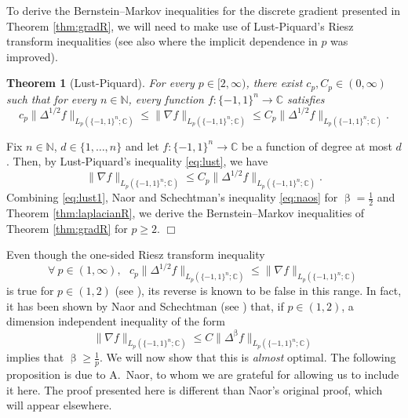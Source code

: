 \documentclass[11pt,reqno]{amsart}
\renewcommand{\leq}{\leqslant}
\renewcommand{\geq}{\geqslant}
\newcommand{\1}{\mathbf 1}
\newtheorem{theorem}{Theorem}
\theoremstyle{remark}
\newcommand{\C}{\mathbb C}
\newcommand{\N}{\mathbb N}
\renewcommand{\beta}{\upbeta}
\begin{document}
\medskip

To derive the Bernstein--Markov inequalities for the discrete gradient presented in Theorem \ref{thm:gradR}, we will need to make use of Lust-Piquard's Riesz transform inequalities \cite{LP98} (see also \cite{BELP08} where the implicit dependence in $p$ was improved).

\begin{theorem} [Lust-Piquard]
For every $p\in[2,\infty)$, there exist $c_p,C_p\in(0,\infty)$ such that for every $n\in\N$, every function $f:\{-1,1\}^n\to\C$ satisfies
\begin{equation} \label{eq:lust}
c_p\|\Delta^{1/2}f\|_{L_p(\{-1,1\}^n;\C)} \leq \|\nabla f\|_{L_p(\{-1,1\}^n;\C)}\leq C_p \|\Delta^{1/2}f\|_{L_p(\{-1,1\}^n;\C)}.
\end{equation}
\end{theorem}

\medskip

\noindent {\it Proof of Theorem \ref{thm:gradR} for $p\geq2$.}
Fix $n\in\N$, $d\in\{1,\ldots,n\}$ and let $f:\{-1,1\}^n\to \C$ be a function of degree at most $d$. Then, by Lust-Piquard's inequality \eqref{eq:lust}, we have
\begin{equation} \label{eq:lust1}
\|\nabla f\|_{L_p(\{-1,1\}^n;\C)}\leq C_p \|\Delta^{1/2}f\|_{L_p(\{-1,1\}^n;\C)}.
\end{equation}
Combining \eqref{eq:lust1}, Naor and Schechtman's inequality \eqref{eq:naos} for $\beta=\frac{1}{2}$ and Theorem \ref{thm:laplacianR}, we derive the Bernstein--Markov inequalities of Theorem \ref{thm:gradR} for $p\geq2$.
\hfill$\Box$

\medskip

Even though the one-sided Riesz transform inequality 
\begin{equation} \label{eq:lust2}
\forall \ p\in(1,\infty), \ \ \ c_p\|\Delta^{1/2}f\|_{L_p(\{-1,1\}^n;\C)} \leq \|\nabla f\|_{L_p(\{-1,1\}^n;\C)}
\end{equation}
is true for $p\in(1,2)$ (see \cite{LP98}), its reverse is known to be false in this range. In fact, it has been shown by Naor and Schechtman (see \cite[Lemma~5.5]{BELP08}) that, if $p\in(1,2)$, a dimension independent inequality of the form
\begin{equation}
\|\nabla f\|_{L_p(\{-1,1\}^n;\C)}\leq C \|\Delta^{\beta}f\|_{L_p(\{-1,1\}^n;\C)}
\end{equation}
implies that $\beta\geq \frac{1}{p}$. We will now show that this is {\it almost} optimal. The following proposition is due to A.~Naor, to whom we are grateful for allowing us to include it here. The proof presented here is different than Naor's original proof, which will appear elsewhere.
\end{document}
